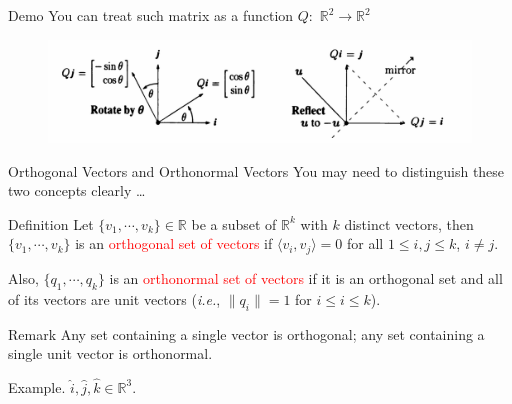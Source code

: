 \documentclass[aspectratio=169, UTF8]{ctexbeamer}
\begin{document}
\begin{frame}{Demo}
    You can treat such matrix as a function $Q:$ $\mathbb{R}^2 \to \mathbb{R}^2$
    \begin{figure}
        \centering
        \includegraphics[width=1\linewidth]{demo_rotate&reflect.png}
        \label{fig:enter-label}
    \end{figure}
\end{frame}
\begin{frame}{Orthogonal Vectors and Orthonormal Vectors}
    You may need to distinguish these two concepts clearly \dots
    \begin{block}{Definition}
        Let $\{v_1,\cdots,v_k\} \in \mathbb{R}$ be a subset of $\mathbb{R}^k$ with $k$ distinct vectors, then $\{v_1,\cdots,v_k\}$ is an \textcolor{red}{orthogonal set of vectors} if $\langle v_i, v_j \rangle = 0$ for all $1 \leq i,j \leq k$, $i \neq j$.

        Also, $\{q_1,\cdots,q_k\}$ is an \textcolor{red}{orthonormal set of vectors} if it is an orthogonal set and all of its vectors are unit vectors (\textit{i.e.}, $\|q_i\| = 1$ for $i \leq i \leq k$).

    \end{block}

    \begin{block}{Remark}
        Any set containing a single vector is orthogonal; any set containing a single unit vector is orthonormal.
    \end{block}

    \begin{block}{Example.} $\hat{i},\hat{j},\hat{k} \in \mathbb{R}^3$.
    \end{block}

\end{frame}
\end{document}
